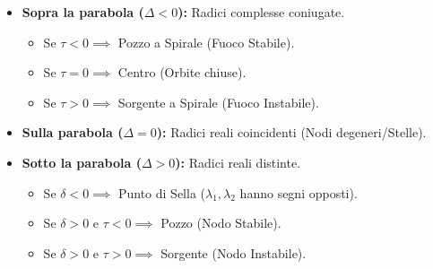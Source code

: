\documentclass[openany]{book}
\theoremstyle{definition}
\theoremstyle{remark}
\begin{document}
\begin{itemize}
    \item \textbf{Sopra la parabola ($\Delta < 0$):} Radici complesse coniugate. 
    \begin{itemize}
        \item Se $\tau < 0 \implies$ Pozzo a Spirale (Fuoco Stabile).
        \item Se $\tau = 0 \implies$ Centro (Orbite chiuse).
        \item Se $\tau > 0 \implies$ Sorgente a Spirale (Fuoco Instabile).
    \end{itemize}
    \item \textbf{Sulla parabola ($\Delta = 0$):} Radici reali coincidenti (Nodi degeneri/Stelle).
    \item \textbf{Sotto la parabola ($\Delta > 0$):} Radici reali distinte.
    \begin{itemize}
        \item Se $\delta < 0 \implies$ Punto di Sella ($\lambda_1, \lambda_2$ hanno segni opposti).
        \item Se $\delta > 0$ e $\tau < 0 \implies$ Pozzo (Nodo Stabile).
        \item Se $\delta > 0$ e $\tau > 0 \implies$ Sorgente (Nodo Instabile).
    \end{itemize}
\end{itemize}
\end{document}
